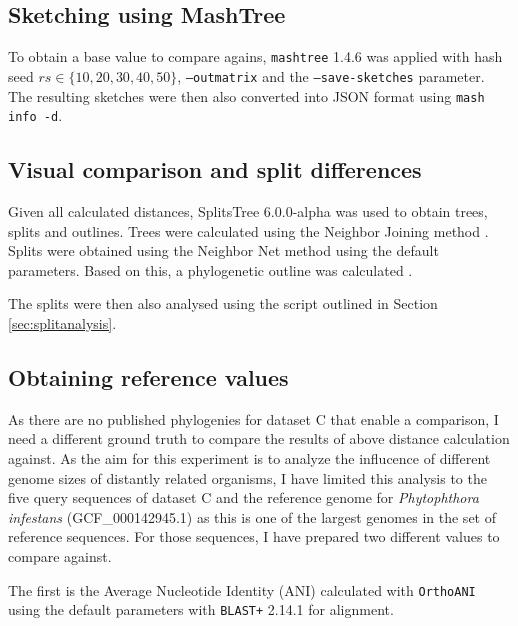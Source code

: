 \subsection*{Sketching using MashTree}
To obtain a base value to compare agains, \texttt{mashtree} 1.4.6
\cite{katzMashtreeRapidComparison2019,ondovMashFastGenome2016} was applied with
hash seed $rs \in \{10, 20, 30, 40, 50\}$, \texttt{--outmatrix} and the
\texttt{--save-sketches} parameter. The resulting sketches were then also
converted into JSON format using \texttt{mash info -d}.

\subsection*{Visual comparison and split differences}
Given all calculated distances, SplitsTree 6.0.0-alpha
\cite{husonApplicationPhylogeneticNetworks2006} was used to obtain trees, splits
and outlines. Trees were calculated using the Neighbor Joining method
\cite{saitouNeighborjoiningMethodNew1987}. Splits were obtained using the
Neighbor Net method
\cite{bryantNeighborNetAgglomerativeMethod2004,bryantNeighborNetImprovedAlgorithms2023}
using the default parameters. Based on this, a phylogenetic outline was
calculated \cite{bagciMicrobialPhylogeneticContext2021}.

The splits were then also analysed using the script outlined in Section
\ref{sec:splitanalysis}.

\subsection*{Obtaining reference values}
As there are no published phylogenies for dataset C that enable a comparison, I
need a different ground truth to compare the results of above distance
calculation against. As the aim for this experiment is to analyze the influcence
of different genome sizes of distantly related organisms, I have limited this
analysis to the five query sequences of dataset C and the reference genome for
\textit{Phytophthora infestans} (GCF\_000142945.1) as this is one of the largest
genomes in the set of reference sequences. For those sequences, I have prepared
two different values to compare against.

The first is the Average Nucleotide Identity (ANI) calculated with
\texttt{OrthoANI} \cite{leeOrthoANIImprovedAlgorithm2016} using the default
parameters with \texttt{BLAST+} 2.14.1
\cite{camachoBLASTArchitectureApplications2009} for alignment.

